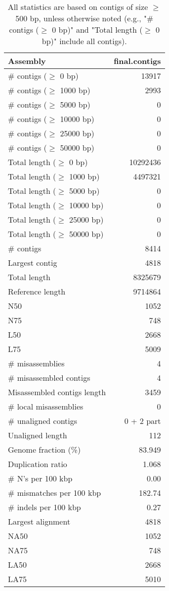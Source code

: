 \documentclass[12pt,a4paper]{article}
\begin{document}
\begin{table}[ht]
\begin{center}
\caption{All statistics are based on contigs of size $\geq$ 500 bp, unless otherwise noted (e.g., "\# contigs ($\geq$ 0 bp)" and "Total length ($\geq$ 0 bp)" include all contigs).}
\begin{tabular}{|l*{1}{|r}|}
\hline
Assembly & final.contigs \\ \hline
\# contigs ($\geq$ 0 bp) & 13917 \\ \hline
\# contigs ($\geq$ 1000 bp) & 2993 \\ \hline
\# contigs ($\geq$ 5000 bp) & 0 \\ \hline
\# contigs ($\geq$ 10000 bp) & 0 \\ \hline
\# contigs ($\geq$ 25000 bp) & 0 \\ \hline
\# contigs ($\geq$ 50000 bp) & 0 \\ \hline
Total length ($\geq$ 0 bp) & 10292436 \\ \hline
Total length ($\geq$ 1000 bp) & 4497321 \\ \hline
Total length ($\geq$ 5000 bp) & 0 \\ \hline
Total length ($\geq$ 10000 bp) & 0 \\ \hline
Total length ($\geq$ 25000 bp) & 0 \\ \hline
Total length ($\geq$ 50000 bp) & 0 \\ \hline
\# contigs & 8414 \\ \hline
Largest contig & 4818 \\ \hline
Total length & 8325679 \\ \hline
Reference length & 9714864 \\ \hline
N50 & 1052 \\ \hline
N75 & 748 \\ \hline
L50 & 2668 \\ \hline
L75 & 5009 \\ \hline
\# misassemblies & 4 \\ \hline
\# misassembled contigs & 4 \\ \hline
Misassembled contigs length & 3459 \\ \hline
\# local misassemblies & 0 \\ \hline
\# unaligned contigs & 0 + 2 part \\ \hline
Unaligned length & 112 \\ \hline
Genome fraction (\%) & 83.949 \\ \hline
Duplication ratio & 1.068 \\ \hline
\# N's per 100 kbp & 0.00 \\ \hline
\# mismatches per 100 kbp & 182.74 \\ \hline
\# indels per 100 kbp & 0.27 \\ \hline
Largest alignment & 4818 \\ \hline
NA50 & 1052 \\ \hline
NA75 & 748 \\ \hline
LA50 & 2668 \\ \hline
LA75 & 5010 \\ \hline
\end{tabular}
\end{center}
\end{table}
\end{document}
